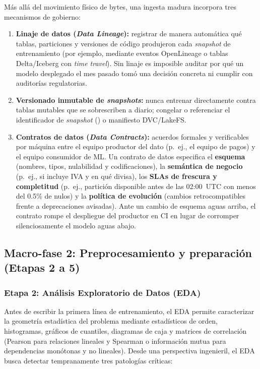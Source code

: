 Más allá del movimiento físico de bytes, una ingesta madura incorpora tres mecanismos de gobierno:
\begin{enumerate}
  \item \textbf{Linaje de datos (\textit{Data Lineage}):} registrar de manera automática qué tablas, particiones y versiones de código produjeron cada \textit{snapshot} de entrenamiento (por ejemplo, mediante eventos OpenLineage o tablas Delta/Iceberg con \textit{time travel}). Sin linaje es imposible auditar por qué un modelo desplegado el mes pasado tomó una decisión concreta ni cumplir con auditorías regulatorias.
  \item \textbf{Versionado inmutable de \textit{snapshots}:} nunca entrenar directamente contra tablas mutables que se sobrescriben a diario; congelar o referenciar el identificador de \textit{snapshot} () o manifiesto DVC/LakeFS.
  \item \textbf{Contratos de datos (\textit{Data Contracts}):} acuerdos formales y verificables por máquina entre el equipo productor del dato (p.~ej., el equipo de pagos) y el equipo consumidor de ML. Un contrato de datos especifica el \textbf{esquema} (nombres, tipos, nulabilidad y codificaciones), la \textbf{semántica de negocio} (p.~ej., si  incluye IVA y en qué divisa), los \textbf{SLAs de frescura y completitud} (p.~ej., partición disponible antes de las 02:00~UTC con menos del 0.5\% de nulos) y la \textbf{política de evolución} (cambios retrocompatibles frente a deprecaciones avisadas). Ante un cambio de esquema aguas arriba, el contrato rompe el despliegue del productor en CI en lugar de corromper silenciosamente el modelo aguas abajo.
\end{enumerate}

\subsection{Macro-fase 2: Preprocesamiento y preparación (Etapas 2 a 5)}

\subsubsection{Etapa 2: Análisis Exploratorio de Datos (EDA)}

Antes de escribir la primera línea de entrenamiento, el EDA permite caracterizar la geometría estadística del problema mediante estadísticos de orden, histogramas, gráficos de cuantiles, diagramas de caja y matrices de correlación (Pearson para relaciones lineales y Spearman o información mutua para dependencias monótonas y no lineales). Desde una perspectiva ingenieril, el EDA busca detectar tempranamente tres patologías críticas:

